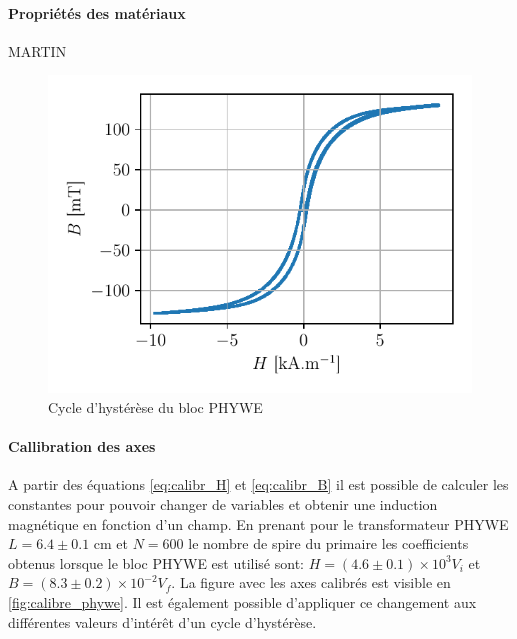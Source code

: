 \paragraph{Propriétés des matériaux}
MARTIN

\begin{minipage}{\linewidth}
    \begin{figure}
        \includegraphics[width=\linewidth]{figures/G1-phywe-avec-bloc_chang.pdf}
        \caption{Cycle d'hystérèse du bloc PHYWE}
        \label{fig:calibr_phywe}
    \end{figure}

    \paragraph{Callibration des axes}
    A partir des équations \autoref{eq:calibr_H} et \autoref{eq:calibr_B} il est possible de calculer les constantes pour pouvoir changer de variables et obtenir une induction magnétique en fonction d'un champ. En prenant pour le transformateur PHYWE \(L = 6.4 \pm 0.1\) \si{\centi \meter} et \(N = 600\) le nombre de spire du primaire les coefficients obtenus lorsque le bloc PHYWE est utilisé sont: \(H = (4.6\pm0.1)\times10^3 V_i\) et \(B = (8.3\pm0.2)\times10^{-2} V_f\). La figure avec les axes calibrés est visible en \autoref{fig:calibre_phywe}.
    Il est également possible d'appliquer ce changement aux différentes valeurs d'intérêt d'un cycle d'hystérèse. 
\end{minipage}

